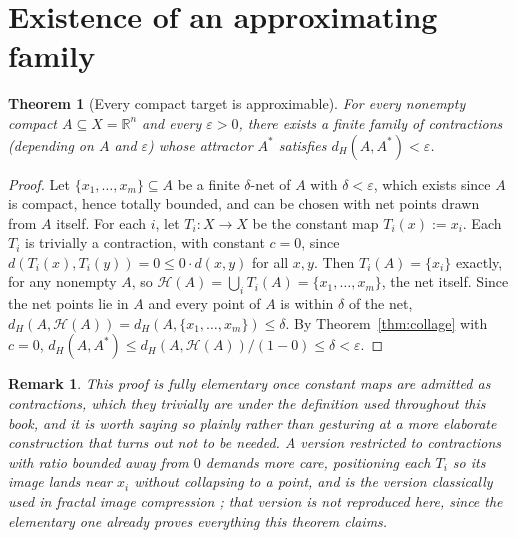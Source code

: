 \documentclass[11pt]{report}
\newtheorem{theorem}{Theorem}[chapter]
\newtheorem{remark}{Remark}[chapter]
\begin{document}
\section*{Existence of an approximating family}

\begin{theorem}[Every compact target is approximable]
\label{thm:existence}
For every nonempty compact $A \subseteq X = \mathbb{R}^n$ and every
$\varepsilon > 0$, there exists a finite family of contractions
(depending on $A$ and $\varepsilon$) whose attractor $A^\ast$
satisfies $d_H(A, A^\ast) < \varepsilon$.
\end{theorem}
\begin{proof}
Let $\{x_1, \dots, x_m\} \subseteq A$ be a finite $\delta$-net of $A$
with $\delta < \varepsilon$, which exists since $A$ is compact, hence
totally bounded, and can be chosen with net points drawn from $A$
itself. For each $i$, let $T_i : X \to X$ be the constant map
$T_i(x) := x_i$. Each $T_i$ is trivially a contraction, with constant
$c = 0$, since $d(T_i(x), T_i(y)) = 0 \leq 0 \cdot d(x,y)$ for all
$x,y$. Then $T_i(A) = \{x_i\}$ exactly, for any nonempty $A$, so
$\mathcal{H}(A) = \bigcup_i T_i(A) = \{x_1, \dots, x_m\}$, the net
itself. Since the net points lie in $A$ and every point of $A$ is
within $\delta$ of the net, $d_H(A, \mathcal{H}(A)) = d_H(A,
\{x_1,\dots,x_m\}) \leq \delta$. By Theorem~\ref{thm:collage} with
$c=0$, $d_H(A, A^\ast) \leq d_H(A,\mathcal{H}(A))/(1-0) \leq \delta <
\varepsilon$.
\end{proof}

\begin{remark}
This proof is fully elementary once constant maps are admitted as
contractions, which they trivially are under the definition used
throughout this book, and it is worth saying so plainly rather than
gesturing at a more elaborate construction that turns out not to be
needed. A version restricted to contractions with ratio bounded away
from $0$ demands more care, positioning each $T_i$ so its image lands
near $x_i$ without collapsing to a point, and is the version
classically used in fractal image compression \cite{barnsley1988};
that version is not reproduced here, since the elementary one already
proves everything this theorem claims.
\end{remark}
\end{document}
